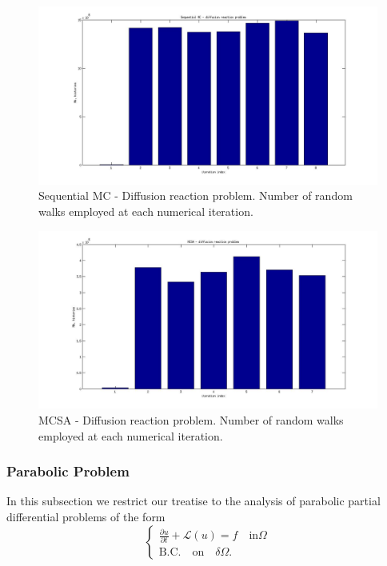 \documentclass[a4paper,10pt]{article}
\begin{document}
\begin{figure}[h!]
  \centering
    \includegraphics[width=\textwidth]{SEQ_diffreac.jpg}
      \caption{Sequential MC - Diffusion reaction problem. Number of random
walks
employed at each
numerical iteration.}
\label{SEQ_diffreac}
\end{figure}


\begin{figure}[h!]
  \centering
    \includegraphics[width=\textwidth]{MCSA_diffreac.jpg}
      \caption{MCSA - Diffusion reaction problem. Number of random walks
employed at each
numerical iteration.}
\label{MCSA_diffreac}
\end{figure}

\subsubsection{Parabolic Problem}

In this subsection we restrict our treatise to the analysis of parabolic
partial
differential problems of the form
\begin{equation}
\begin{cases}
 \frac{\partial u }{\partial t} + \mathcal{L}(u)=f \quad \text{in} \Omega \\
\text{B.C.} \quad \text{on}\quad \delta \Omega.
\end{cases}
\label{parabolic}
\end{equation}
\end{document}
